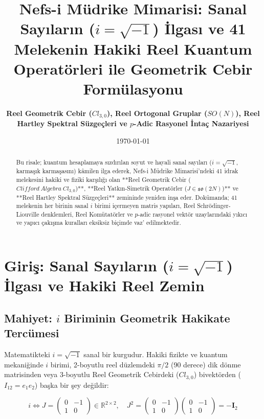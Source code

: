 \documentclass[11pt, a4paper]{article}
\title{\textbf{Nefs-i Müdrike Mimarisi: Sanal Sayıların ($i = \sqrt{-1}$) İlgası ve 41 Melekenin Hakiki Reel Kuantum Operatörleri ile Geometrik Cebir Formülasyonu}}
\author{\textbf{Reel Geometrik Cebir ($Cl_{3,0}$), Reel Ortogonal Gruplar ($SO(N)$), Reel Hartley Spektral Süzgeçleri ve $p$-Adic Rasyonel İntaç Nazariyesi}}
\date{\today}
\begin{document}
\maketitle

\begin{abstract}
Bu risale; kuantum hesaplamaya sızdırılan soyut ve hayali sanal sayıları ($i = \sqrt{-1}$, karmaşık karmaşasını) kâmilen ilga ederek, Nefs-i Müdrike Mimarisi'ndeki 41 idrak melekesini hakiki ve fiziki karşılığı olan **Reel Geometrik Cebir ($Clifford\ Algebra\ Cl_{3,0}$)**, **Reel Yatkın-Simetrik Operatörler ($J \in \mathfrak{so}(2N)$)** ve **Reel Hartley Spektral Süzgeçleri** zemininde yeniden inşa eder. Dokümanda; 41 melekenin her birinin sanal $i$ birimi içermeyen matris yapıları, Reel Schrödinger-Liouville denklemleri, Reel Komütatörler ve $p$-adic rasyonel vektör uzaylarındaki yıkıcı ve yapıcı çakışma kuralları eksiksiz biçimde vaz' edilmektedir.
\end{abstract}

\tableofcontents
\newpage

\section{Giriş: Sanal Sayıların ($i = \sqrt{-1}$) İlgası ve Hakiki Reel Zemin}

\subsection{Mahiyet: $i$ Biriminin Geometrik Hakikate Tercümesi}
Matematikteki $i = \sqrt{-1}$ sanal bir kurgudur. Hakiki fizikte ve kuantum mekaniğinde $i$ birimi, 2-boyutlu reel düzlemdeki $\pi/2$ (90 derece) dik dönme matrisinden veya 3-boyutlu Reel Geometrik Cebirdeki ($Cl_{3,0}$) bivektörden ($I_{12} = e_1 e_2$) başka bir şey değildir:

\begin{equation}
i \iff J = \begin{pmatrix} 0 & -1 \\ 1 & 0 \end{pmatrix} \in \mathbb{R}^{2 \times 2}, \quad J^2 = \begin{pmatrix} 0 & -1 \\ 1 & 0 \end{pmatrix} \begin{pmatrix} 0 & -1 \\ 1 & 0 \end{pmatrix} = -\mathbf{I}_2
\end{equation}
\end{document}
